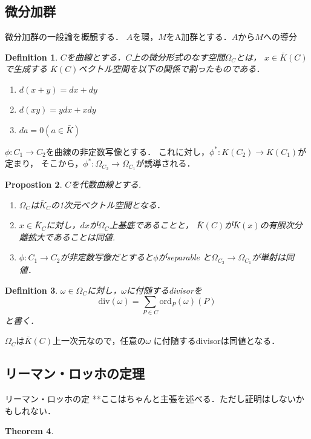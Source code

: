 \documentclass{ujarticle}
\newtheorem{thm}{Theorem}[section]
\newtheorem{dfn}[thm]{Definition}
\newtheorem{prop}[thm]{Propostion}
\begin{document}
\subsection{微分加群}
\label{sub:微分加群}
微分加群の一般論を概観する．
$A$を環，$M$をA加群とする．$A$から$M$への導分

\begin{dfn}
 $C$を曲線とする．$C$上の微分形式のなす空間$\Omega_{C}$とは，
 $x \in \bar{K}(C)$で生成する
 $\bar{K}(C)$ベクトル空間を以下の関係で割ったものである．
 \begin{enumerate}
   \item $d(x + y)= dx+dy$
   \item $d(xy)= ydx + xdy$
  　\item $da = 0  (a \in \bar{K})$
 \end{enumerate}
\end{dfn}

$\phi :C_1 \to C_2$を曲線の非定数写像とする．
これに対し，$\phi^* : K(C_2) \to K(C_1)$が定まり，
そこから，$\phi^*: \Omega_{C_2} \to \Omega_{C_1}$が誘導される．

\begin{prop}
 $C$を代数曲線とする.
 \begin{enumerate}
   \item $\Omega_{C}$は$\bar{K}_C$の1次元ベクトル空間となる．
   \item $x \in \bar{K}_C$に対し，$dx$が$\Omega_C$上基底であることと，
   $\bar{K}(C)$が$\bar{K}(x)$の有限次分離拡大であることは同値.
   \item $\phi:C_1 \to C_2$が非定数写像だとすると$\phi$がseparable
   と$\Omega_{C_2} \to \Omega_{C_1}$が単射は同値．
 \end{enumerate}
\end{prop}

\begin{dfn}
 $\omega \in \Omega_C$に対し，$\omega$に付随するdivisorを
 \begin{equation*}
  \mathrm{div}(\omega)=\sum_{P \in C}\mathrm{ord}_P(\omega)(P)
 \end{equation*}
 と書く．
\end{dfn}
$\Omega_C$は$\bar{K}(C)$上一次元なので，任意の$\omega$
に付随するdivisorは同値となる．
\subsection{リーマン・ロッホの定理}
\label{sub:リーマン・ロッホの定理}

リーマン・ロッホの定
**ここはちゃんと主張を述べる．ただし証明はしないかもしれない．
\begin{thm}

\end{thm}
\end{document}
